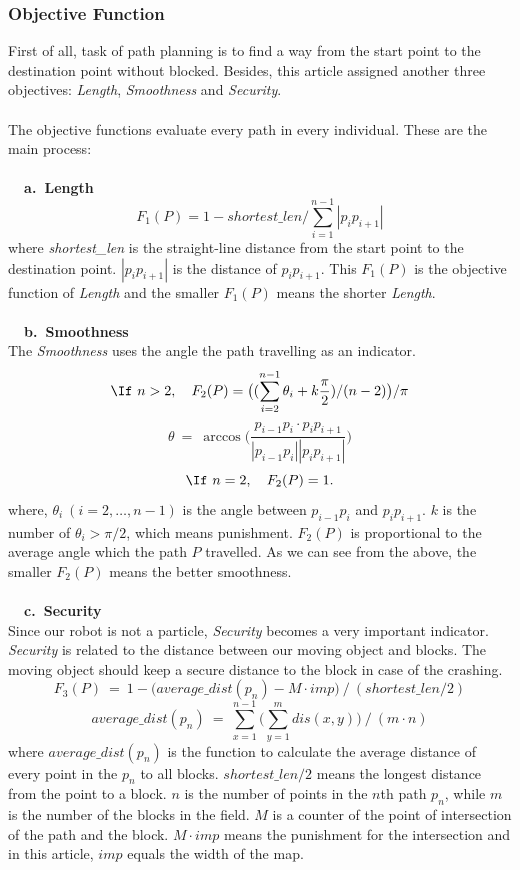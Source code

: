 \documentclass[a4paper, 11pt]{article}
\begin{document}
\subsubsection{Objective Function\cite{zhou2011multiobjective}}
First of all, task of path planning is to find a way from the start point to the destination point without blocked. Besides, this article assigned another three objectives: \emph{Length}, \emph{Smoothness} and \emph{Security}.\\
\\
The objective functions evaluate every path in every individual.
These are the main process:\\
\\
\textbf{~~a.~Length}
$$
F_1(P)=1-shortest\_len\big/\sum^{n-1}_{i=1}|p_i p_{i+1}|
$$
where \emph{shortest\_len} is the straight-line distance from the start point to the destination point. $|p_i p_{i+1}|$ is the distance of $p_i p_{i+1}$. This $F_1(P)$ is the objective function of \emph{Length} and the smaller $F_1(P)$ means the shorter \emph{Length}.\\
\\
\textbf{~~b.~Smoothness}\\
The \emph{Smoothness} uses the angle the path travelling as an indicator.
$$
\If\ n>2,\quad F_2(P)=\big((\sum^{n-1}_{i=2}\theta_i+k\frac{\pi}{2})/(n-2)\big)/\pi
$$
$$
\theta\ =\ \arccos\big(\frac{p_{i-1}p_i\cdot p_i p_{i+1}}{|p_{i-1}p_i||p_i p_{i+1}|}\big)
$$
$$
\If\ n=2,\quad F_2(P)=1.
$$
where, $\theta_i\ (i=2,\ldots,n-1)$ is the angle between $p_{i-1}p_i$ and $p_i p_{i+1}$. $k$ is the number of $\theta_i>\pi/2$, which means punishment. $F_2(P)$ is proportional to the average angle which the path $P$ travelled. As we can see from the above, the smaller $F_2(P)$ means the better smoothness.\\
\\
\textbf{~~c.~Security}\\
Since our robot is not a particle, \emph{Security} becomes a very important indicator. \emph{Security} is related to the distance between our moving object and blocks. The moving object should keep a secure distance to the block in case of the crashing.
$$
F_3(P)\ =\ 1-\big(average\_dist(p_n)-M\cdot imp\big)\ \big/\ (shortest\_len/2)
$$
$$
average\_dist(p_n)\ =\ \sum^{n-1}_{x=1}\big(\sum^{m}_{y=1}dis(x,y)\big)\ \big/\ (m\cdot n)
$$
where $average\_dist(p_n)$ is the function to calculate the average distance of every point in the $p_n$ to all blocks. $shortest\_len/2$ means the longest distance from the point to a block. $n$ is the number of points in the $n$th path $p_n$, while $m$ is the number of the blocks in the field. $M$ is a counter of the point of intersection of the path and the block. $M\cdot imp$ means the punishment for the intersection and in this article, $imp$ equals the width of the map.\\
\end{document}
